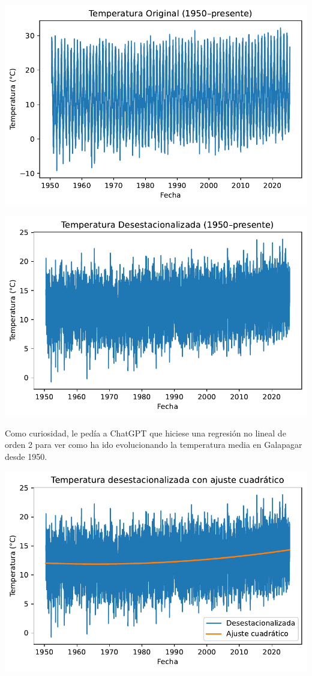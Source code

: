 \documentclass[
  10pt,
  a4paper,
  DIV=11,
  numbers=noendperiod,
  open=any]{scrreprt}
\makeatletter
\newcommand*\pandocbounded[1]{%
  \sbox\pandoc@box{#1}%
  \Gscale@div\@tempa{\textheight}{\dimexpr\ht\pandoc@box+\dp\pandoc@box\relax}%
  \Gscale@div\@tempb{\linewidth}{\wd\pandoc@box}%
  \ifdim\@tempb\p@<\@tempa\p@\let\@tempa\@tempb\fi%
  \ifdim\@tempa\p@<\p@\scalebox{\@tempa}{\usebox\pandoc@box}%
  \else\usebox{\pandoc@box}%
  \fi%
}
\numberwithin{equation}{chapter}
\numberwithin{equation}{section}
\renewcommand{\[}{\begin{equation}}
\renewcommand{\]}{\end{equation}}
\providecommand{\pandocbounded}[1]{#1}%
\renewcommand{\pandocbounded}[1]{\begingroup\centering #1\par\endgroup}
\makeatother
\begin{document}
\pandocbounded{\includegraphics[keepaspectratio]{03-meteorologia/calculolyapunov_files/figure-pdf/cell-2-output-1.pdf}}

\pandocbounded{\includegraphics[keepaspectratio]{03-meteorologia/calculolyapunov_files/figure-pdf/cell-2-output-2.pdf}}

Como curiosidad, le pedía a ChatGPT que hiciese una regresión no lineal
de orden 2 para ver como ha ido evolucionando la temperatura media en
Galapagar desde 1950.

\pandocbounded{\includegraphics[keepaspectratio]{03-meteorologia/calculolyapunov_files/figure-pdf/cell-3-output-1.pdf}}
\end{document}
